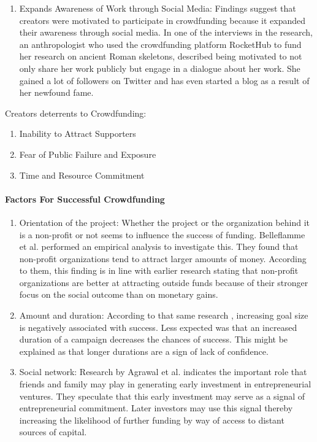 \begin{enumerate}
      \item Expands Awareness  of Work  through Social Media:     
            Findings suggest that creators were motivated to
            participate in crowdfunding because it expanded their awareness through social media. In one of the
            interviews in the research, an anthropologist who used the crowdfunding platform RocketHub to fund
            her research on ancient Roman skeletons, described being motivated to not only share her work publicly but engage in a dialogue about her work. She gained a lot of followers on Twitter and has even
            started a blog as a result of her newfound fame.

\end{enumerate}

Creators deterrents to Crowdfunding:
\begin{enumerate}
      \item Inability to Attract Supporters
      \item Fear of Public Failure and Exposure
      \item Time and Resource Commitment
\end{enumerate}

\paragraph*{Factors For Successful Crowdfunding}
\begin{enumerate}
      \item Orientation of the project:     
      Whether the project or the organization behind it is a non-profit or not
            seems to influence the success of funding. Belleflamme et al. \cite{doi:10.1080/13691066.2013.785151} performed an empirical analysis
            to investigate this. They found that non-profit organizations tend to attract larger amounts of money.
            According to them, this finding is in line with earlier research stating that non-profit organizations
            are better at attracting outside funds because of their stronger focus on the social outcome than on
            monetary gains.

      \item Amount and duration:     
      According to that same research \cite{doi:10.1080/13691066.2013.785151}, increasing goal size is negatively associated
            with success. Less expected was that an increased duration of a campaign decreases the chances of
            success. This might be explained as that longer durations are a sign of lack of confidence.

      \item Social network:     
      Research by Agrawal et al. \cite{NBERw16820} indicates the important role that friends and family may
            play in generating early investment in entrepreneurial ventures. They speculate that this early investment may serve as a signal of entrepreneurial commitment. Later investors may use this signal thereby
            increasing the likelihood of further funding by way of access to distant sources of capital.
\end{enumerate}


